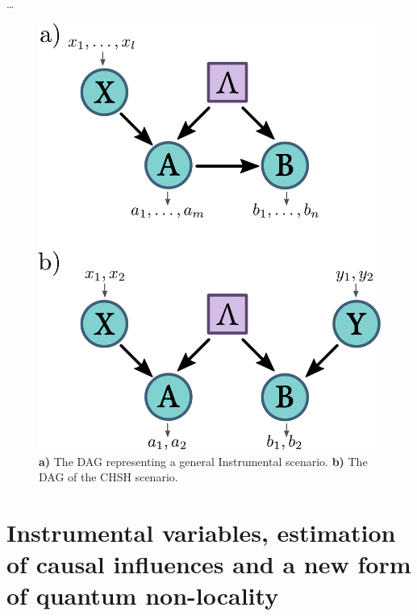 \documentclass[letterpaper]{article}
\begin{document}
\ldots

\begin{figure}[h]
    \centering
    \includegraphics[width=.8\columnwidth]{images/chsh_inst_dag.pdf}
        \caption{
    \textbf{a)} The DAG representing a general Instrumental scenario.
    \textbf{b)} The DAG of the CHSH scenario.
}
    \label{fig:chshinstdag}

\end{figure}

\section*{Instrumental variables, estimation of causal influences and a new form of quantum non-locality}
\end{document}
